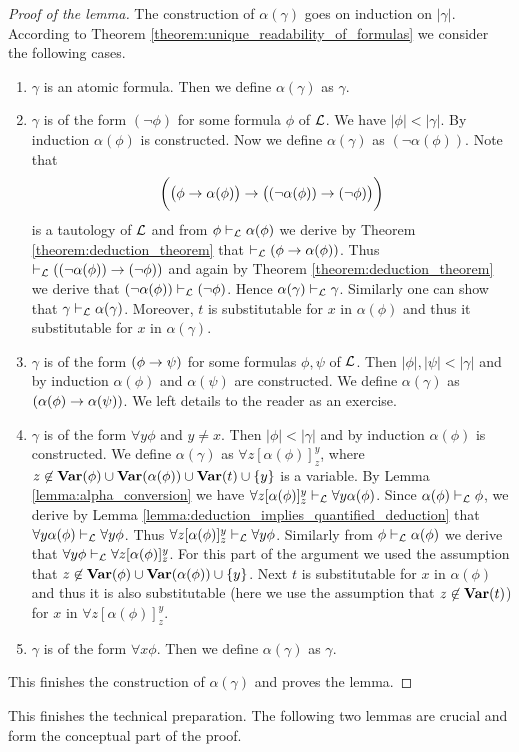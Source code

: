 \documentclass[10pt]{amsart}
\begin{document}
\begin{proof}[Proof of the lemma]
	The construction of $\alpha(\gamma)$ goes on induction on $|\gamma|$. According to Theorem \ref{theorem:unique_readability_of_formulas} we consider the following cases.
	\begin{enumerate}[label=\textbf{(\arabic*)}, leftmargin=3.0em]
		\item $\gamma$ is an atomic formula. Then we define $\alpha(\gamma)$ as $\gamma$.
		\item $\gamma$ is of the form $(\neg\phi)$ for some formula $\phi$ of ${\mathcal L}$. We have $|\phi| < |\gamma|$. By induction $\alpha(\phi)$ is constructed. Now we define $\alpha(\gamma)$ as $\left(\neg\alpha(\phi)\right)$. Note that
		      $$\bigg(\big(\phi \rightarrow \alpha(\phi)\big) \rightarrow \big((\neg\alpha(\phi)) \rightarrow (\neg \phi)\big)\bigg)$$
		      is a tautology of ${\mathcal L}$ and from $\phi \vdash_{{\mathcal L}} \alpha(\phi)$ we derive by Theorem \ref{theorem:deduction_theorem} that $\vdash_{{\mathcal L}} (\phi \rightarrow \alpha(\phi))$. Thus $\vdash_{{\mathcal L}} ((\neg\alpha(\phi)) \rightarrow (\neg\phi))$ and again by Theorem \ref{theorem:deduction_theorem} we derive that $(\neg\alpha(\phi)) \vdash_{{\mathcal L}} (\neg\phi)$. Hence $\alpha(\gamma) \vdash_{{\mathcal L}} \gamma$. Similarly one can show that $\gamma \vdash_{{\mathcal L}} \alpha(\gamma)$. Moreover, $t$ is substitutable for
		      $x$ in $\alpha(\phi)$ and thus it substitutable for $x$ in $\alpha(\gamma)$.
		\item $\gamma$ is of the form $(\phi \rightarrow \psi)$ for some formulas $\phi, \psi$ of ${\mathcal L}$. Then $|\phi|, |\psi| < |\gamma|$ and by induction $\alpha(\phi)$ and $\alpha(\psi)$ are constructed. We define $\alpha(\gamma)$ as $(\alpha(\phi) \rightarrow \alpha(\psi))$. We left details to the reader as an exercise.
		\item $\gamma$ is of the form $\forall y\phi$ and $y \neq x$. Then $|\phi| < |\gamma|$ and by induction $\alpha(\phi)$ is constructed. We define $\alpha(\gamma)$ as $\forall z[\alpha(\phi)]^y_z$, where $z \not \in \mathbf{Var}(\phi) \cup \mathbf{Var}(\alpha(\phi)) \cup \mathbf{Var}(t) \cup \{y\}$ is a variable. By Lemma \ref{lemma:alpha_conversion} we have $\forall z[\alpha(\phi)]^y_z \vdash_{{\mathcal L}} \forall y \alpha(\phi)$. Since $\alpha(\phi) \vdash_{{\mathcal L}} \phi$, we derive by Lemma \ref{lemma:deduction_implies_quantified_deduction} that $\forall y \alpha(\phi) \vdash_{{\mathcal L}} \forall y\phi$. Thus $\forall z[\alpha(\phi)]^y_z \vdash_{{\mathcal L}} \forall y\phi$. Similarly from $\phi \vdash_{{\mathcal L}} \alpha(\phi)$ we derive that $\forall y\phi \vdash_{{\mathcal L}} \forall z[\alpha(\phi)]^y_z$. For this part of the argument we used the assumption that $z \not \in \mathbf{Var}(\phi) \cup \mathbf{Var}(\alpha(\phi)) \cup \{y\}$. Next $t$ is substitutable for $x$ in $\alpha(\phi)$ and thus it is also substitutable (here we use the assumption that $z \not \in \mathbf{Var}(t)$) for $x$ in $\forall z[\alpha(\phi)]^y_z$.
		\item $\gamma$ is of the form $\forall x\phi$. Then we define $\alpha(\gamma)$ as $\gamma$.
	\end{enumerate}
	This finishes the construction of $\alpha(\gamma)$ and proves the lemma.
\end{proof}
\noindent
This finishes the technical preparation. The following two lemmas are crucial and form the conceptual part of the proof.
\end{document}

